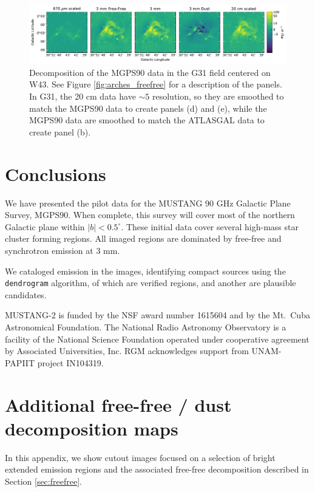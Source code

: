 \documentclass[twocolumn]{aastex62}
\newcommand{\MUSTANG}{MUSTANG-2\xspace}
\begin{document}
\begin{figure}[htp]
    \includegraphics[width=17cm]{figures/G31_w43_5panel.pdf}
    \caption{Decomposition of the MGPS90 data in the G31 field centered on W43.
    See Figure \ref{fig:arches_freefree} for a description of the panels.
    In G31, the 20 cm data have $\sim5$ \arcsec resolution, so they are
    smoothed to match the MGPS90 data to create panels (d) and (e), while the
    MGPS90 data are smoothed to match the ATLASGAL data to create panel (b).
}
\label{fig:w43freefree}
\end{figure}





\section{Conclusions}
We have presented the pilot data for the MUSTANG 90 GHz Galactic Plane
Survey, MGPS90.  When complete, this survey
will cover most of the northern Galactic plane within $|b|<0.5^\circ$.
These initial data cover several high-mass star cluster
forming regions.  All imaged regions are dominated by free-free and synchrotron
emission at 3 mm.  

We cataloged emission in the images, identifying \nsources compact sources using the
\texttt{dendrogram} algorithm, of which \ncompacthiicand are verified \hchii
regions, and another \mmdetectionscmnondetectionscompact are plausible
candidates.  

\acknowledgements
\MUSTANG is funded by the NSF award number 1615604 and by the Mt.\ Cuba
Astronomical Foundation. The National Radio Astronomy Observatory is a facility
of the National Science Foundation operated under cooperative agreement by
Associated Universities, Inc. 
RGM acknowledges support from UNAM-PAPIIT project IN104319. 



\appendix

\section{Additional free-free / dust decomposition maps}
In this appendix, we show cutout images focused on a selection of bright
extended emission regions and the associated free-free decomposition described
in Section \ref{sec:freefree}.
\end{document}

